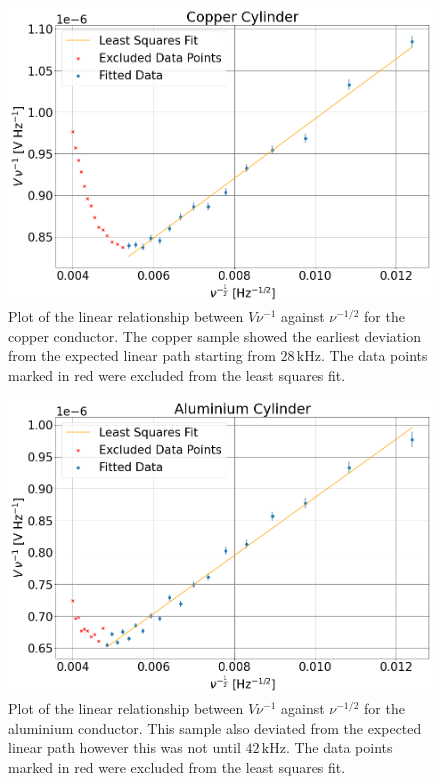 \documentclass[a4paper,12pt,twocolumn]{article}
\begin{document}
		\begin{figure}
		\centering
		\includegraphics[scale=0.4]{copperGraph.png}
		\captionsetup{font=scriptsize}
		\caption{Plot of the linear relationship between $V\nu^{-1}$ against $\nu^{-1/2}$ for the copper conductor. The copper sample showed the earliest deviation from the expected linear path starting from $28 \,\text{kHz}$. The data points marked in red were excluded from the least squares fit.}
		\label{fig:copperGraph}
	\end{figure}
	\begin{figure}
		\centering
		\includegraphics[scale=0.4]{aluminiumGraph.png}
		\captionsetup{font=scriptsize}
		\caption{Plot of the linear relationship between $V\nu^{-1}$ against $\nu^{-1/2}$ for the aluminium conductor. This sample also deviated from the expected linear path however this was not until $42 \,\text{kHz}$. The data points marked in red were excluded from the least squares fit.}
		\label{fig:aluminiumGraph}
	\end{figure}
\end{document}
